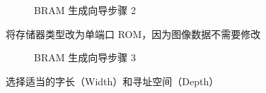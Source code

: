 \documentclass[hyperref,UTF8,12pt,a4paper]{ctexart}
\begin{document}
\begin{figure}[H]
\centering
{}
\caption{BRAM 生成向导步骤 2}
\end{figure}

将存储器类型改为单端口 ROM，因为图像数据不需要修改

\begin{figure}[H]
\centering
{}
\caption{BRAM 生成向导步骤 3}
\end{figure}

选择适当的字长（Width）和寻址空间（Depth）
\end{document}
